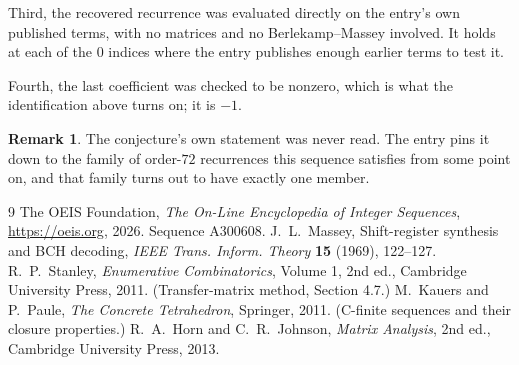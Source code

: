 \documentclass[11pt,a4paper]{article}
\theoremstyle{plain}
\theoremstyle{definition}
\newtheorem{remark}[theorem]{Remark}
\begin{document}
Third, the recovered recurrence was evaluated directly on the entry's own published terms, with
no matrices and no Berlekamp--Massey involved. It holds at each of the $0$ indices where
the entry publishes enough earlier terms to test it.

Fourth, the last coefficient was checked to be nonzero, which is what the identification above
turns on; it is $-1$.

\begin{remark}
The conjecture's own statement was never read. The entry pins it down to the family of
order-$72$ recurrences this sequence satisfies from some point on, and that family turns
out to have exactly one member.
\end{remark}

\begin{thebibliography}{9}
 The OEIS Foundation, \emph{The On-Line Encyclopedia of Integer
Sequences}, \url{https://oeis.org}, 2026. Sequence A300608.
 J.~L.~Massey, Shift-register synthesis and BCH decoding, \emph{IEEE
Trans. Inform. Theory} \textbf{15} (1969), 122--127.
 R.~P.~Stanley, \emph{Enumerative Combinatorics}, Volume 1, 2nd ed.,
Cambridge University Press, 2011. (Transfer-matrix method, Section 4.7.)
 M.~Kauers and P.~Paule, \emph{The Concrete Tetrahedron}, Springer, 2011.
(C-finite sequences and their closure properties.)
 R.~A.~Horn and C.~R.~Johnson, \emph{Matrix Analysis}, 2nd ed., Cambridge
University Press, 2013.
\end{thebibliography}
\end{document}
